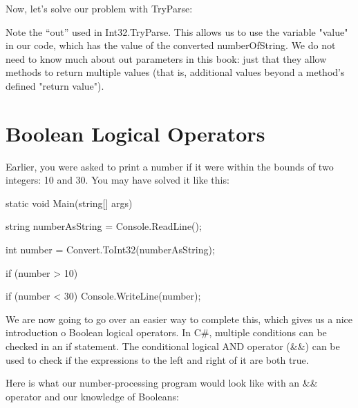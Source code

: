 \documentclass[oneside, openany] {book}
\begin{document}
Now, let’s solve our problem with TryParse:

Note the “out” used in Int32.TryParse. This allows us to use the variable "value" in our code, which has the value of the converted numberOfString. We do not need to know much about out parameters in this book: just that they allow methods to return multiple values (that is, additional values beyond a method's defined "return value").


\section{Boolean Logical Operators}
Earlier, you were asked to print a number if it were within the bounds of two integers: 10 and 30. You may have solved it like this:  

\begin{CSharp}
static void Main(string[] args)
        {
            string numberAsString = Console.ReadLine();

            int number = Convert.ToInt32(numberAsString);

            if (number > 10)
            {
                if (number < 30)
                {
                    Console.WriteLine(number);
                }
                
            }
        }

\end{CSharp}
We are now going to go over an easier way to complete this, which gives us a nice introduction o Boolean logical operators.  
\index{\&\&}
In C\#, multiple conditions can be checked in an if statement. The conditional logical AND operator (\&\&) can be used to check if the expressions to the left and right of it are both true. 

Here is what our number-processing program would look like with an \&\& operator and our knowledge of Booleans:
\end{document}
